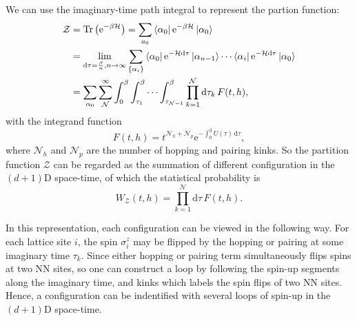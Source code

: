 \documentclass{article}
\DeclareMathOperator{\Tr}{Tr}
\theoremstyle{plain} \newtheorem{thm}{Theorem}[section]
\theoremstyle{definition} \newtheorem{df}{Definition}[section]
\theoremstyle{definition} \newtheorem{eg}{Example}
\theoremstyle{remark} \newtheorem*{rmk}{Remark}
\begin{document}
We can use the imaginary-time path integral to represent the partion function: 
\begin{align}
  \mathcal{Z} &= \Tr \left(\mathrm{e}^{-\beta \mathcal{H}}\right) = \sum_{a_0}\bra{\alpha_0}\mathrm{e}^{-\beta \mathcal{H}}\ket{\alpha_0}\\
              &= \lim_{\mathrm{d}\tau = \frac{\beta}{n}, n \to \infty} \sum_{\{\alpha_i\}}\bra{\alpha_0}\mathrm{e}^{-\mathcal{H}\mathrm{d}\tau}\ket{\alpha_{n-1}}\cdots \bra{\alpha_i}\mathrm{e}^{-\mathcal{H}\mathrm{d}\tau}\ket{\alpha_0}\\
              &= \sum_{\alpha_0}\sum_{\mathcal{N}}^{\infty}\int_{0}^{\beta}\int_{\tau_1}^{\beta}\cdots \int_{\tau_{\mathcal{N}-1}}^{\beta} \prod_{k=1}^{\mathcal{N}}\mathrm{d}\tau_k\,F(t, h),
\end{align}
with the integrand function
\begin{equation}
  F(t, h) = t^{\mathcal{N}_h+\mathcal{N}_p}\mathrm{e}^{-\int_{0}^{\beta}U(\tau)\,\mathrm{d}\tau},
  \label{eq:integrand}
\end{equation}
where $\mathcal{N}_h$ and $\mathcal{N}_p$ are the number of hopping and pairing kinks. So the partition function $\mathcal{Z}$ can be regarded as the summation of different configuration in the $(d+1)$D space-time, of which the statistical probability is
\begin{equation}
  W_{\mathcal{Z}}(t, h) = \prod_{k=1}^{\mathcal{N}}\mathrm{d}\tau\,F(t, h).
\end{equation}

In this representation, each configuration can be viewed in the following way. For each lattice site $i$, the spin $\sigma_i^z$ may be flipped by the hopping or pairing at some imaginary time $\tau_k$. Since either hopping or pairing term simultaneously flips spins at two NN sites, so one can construct a loop by following the spin-up segments along the imaginary time, and kinks which labels the spin flips of two NN sites. Hence, a configuration can be indentified with several loops of spin-up in the $(d+1)$D space-time.
\end{document}
